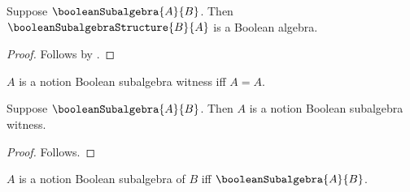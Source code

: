 

\begin{classification}\label{notion_boolean_subalgebra_structure_result}
    Suppose $\booleanSubalgebra{A}{B}$.
    Then $\booleanSubalgebraStructure{B}{A}$ is a Boolean algebra.
\end{classification}
\begin{proof}
    Follows by
        .
\end{proof}

\begin{definition}\label{notion_boolean_subalgebra_witness}
    $A$ is a notion Boolean subalgebra witness iff $A=A$.
\end{definition}

\begin{classification}\label{notion_boolean_subalgebra_witness_view}
    Suppose $\booleanSubalgebra{A}{B}$.
    Then $A$ is a notion Boolean subalgebra witness.
\end{classification}
\begin{proof}
    Follows.
\end{proof}

\begin{abbreviation}\label{notion_boolean_subalgebra_alias}
    $A$ is a notion Boolean subalgebra of $B$ iff
        $\booleanSubalgebra{A}{B}$.
\end{abbreviation}
